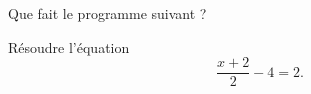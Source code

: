 
\begin{exercice}\label{exosmath-0002}

    Que fait le programme suivant ?
    


Résoudre l'équation 
\begin{equation}
    \frac{ x+2 }{2}-4=2.
\end{equation}

\end{exercice}
